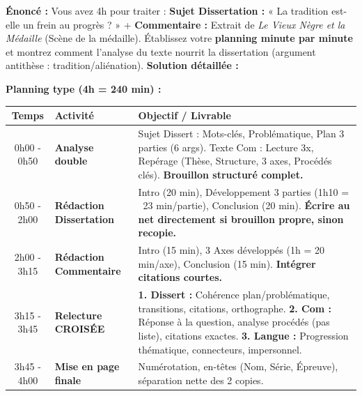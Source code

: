 \documentclass[11pt]{article}
\begin{document}
\begin{exoresolu}
    \textbf{Énoncé :} Vous avez 4h pour traiter : \textbf{Sujet Dissertation :} « La tradition est-elle un frein au progrès ? » + \textbf{Commentaire :} Extrait de \emph{Le Vieux Nègre et la Médaille} (Scène de la médaille). Établissez votre \textbf{planning minute par minute} et montrez comment l'analyse du texte nourrit la dissertation (argument antithèse : tradition/aliénation).
    \tcblower
    \textbf{Solution détaillée :}
    
    \textbf{Planning type (4h = 240 min) :}
    \begin{center}
    \begin{tabularx}{\linewidth}{|c|X|X|}\hline
    \textbf{Temps} & \textbf{Activité} & \textbf{Objectif / Livrable} \\ \hline
    0h00 - 0h50 & \textbf{Analyse double} & Sujet Dissert : Mots-clés, Problématique, Plan 3 parties (6 args). Texte Com : Lecture 3x, Repérage (Thèse, Structure, 3 axes, Procédés clés). \textbf{Brouillon structuré complet.} \\ \hline
    0h50 - 2h00 & \textbf{Rédaction Dissertation} & Intro (20 min), Développement 3 parties (1h10 = ~23 min/partie), Conclusion (20 min). \textbf{Écrire au net directement si brouillon propre, sinon recopie.} \\ \hline
    2h00 - 3h15 & \textbf{Rédaction Commentaire} & Intro (15 min), 3 Axes développés (1h = 20 min/axe), Conclusion (15 min). \textbf{Intégrer citations courtes.} \\ \hline
    3h15 - 3h45 & \textbf{Relecture CROISÉE} & \textbf{1. Dissert :} Cohérence plan/problématique, transitions, citations, orthographe. \textbf{2. Com :} Réponse à la question, analyse procédés (pas liste), citations exactes. \textbf{3. Langue :} Progression thématique, connecteurs, impersonnel. \\ \hline
    3h45 - 4h00 & \textbf{Mise en page finale} & Numérotation, en-têtes (Nom, Série, Épreuve), séparation nette des 2 copies. \\ \hline
    \end{tabularx}
    \end{center}
    

\end{exoresolu}
\end{document}
